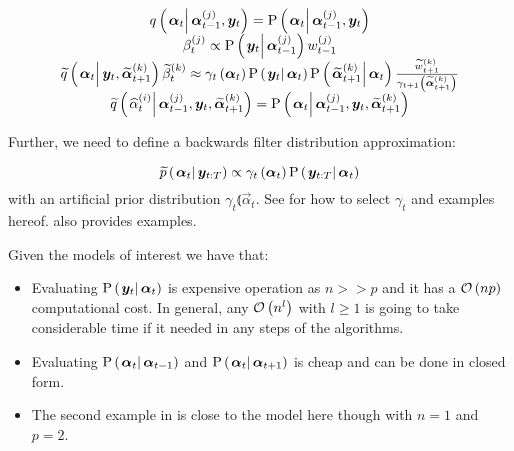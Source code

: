 \begin{equation}\begin{matrix}
	\IDC{\vec{\alpha}_t}{\partic{\vec{\alpha}}{t-1}{j}, \vec{y}_t} = \propC{\vec{\alpha}_t}{\partic{\vec{\alpha}}{t-1}{j}, \vec{y}_t} \\
	\partic{\beta}{t}{j} \propto \propC{\vec{y}_t}{\partic{\vec{\alpha}}{t-1}{j}}\partic{w}{t-1}{j} \\
%
	\IDAproxC{\vec{\alpha}_t}{\vec{y}_t, \particB{\vec{\alpha}}{t + 1}{k}}\particB{\beta}{t}{k} \approx %
		\gamma_t\Lparen{\vec{\alpha}_t}
		\propC{\vec{y}_t}{\vec{\alpha}_t}
		\propC{\particB{\vec{\alpha}}{t + 1}{k}}{\vec{\alpha}_t}
		\frac{\particB{w}{t + 1}{k}}{\gamma_{t + 1}\Lparen{\particB{\vec{\alpha}}{t + 1}{k}}} \\
%
	\IDAproxC{\particS{\alpha}{t}{i}}{\partic{\vec{\alpha}}{t-1}{j},\vec{y}_t, \particB{\vec{\alpha}}{t+1}{k}} = 
		\propC{\vec{\alpha}_t}{\partic{\vec{\alpha}}{t-1}{j},\vec{y}_t, \particB{\vec{\alpha}}{t+1}{k}}
\end{matrix}\end{equation}

Further, we need to define a backwards filter distribution approximation:

\begin{equation}
	\propAproxC{\vec{\alpha}_t}{\vec{y}_{t:T}} \propto \gamma_t \Lparen{\vec{\alpha}_t}\propC{\vec{y}_{t:T}}{\vec{\alpha}_t}
\end{equation}%
%
with an artificial prior distribution $\gamma_t \Lparen{\vec{\alpha}_t}$. See \cite{briers10} for how to select $\gamma_t$ and examples hereof. \cite{fearnhead10} also provides examples. 

Given the models of interest we have that:

\begin{itemize}
	\item Evaluating $\propC{\vec{y}_t}{\vec{\alpha}_t}$ is expensive operation as $n >> p$ and it has a $\mathcal{O}\left( np\right)$ computational cost. In general, any $\mathcal{O}\left( n^l\right)$ with $l \geq 1$ is going to take considerable time if it needed in any steps of the algorithms. 
	\item Evaluating $\propC{\vec{\alpha}_t}{\vec{\alpha}_{t -1}}$ and $\propC{\vec{\alpha}_t}{\vec{\alpha}_{t + 1}}$ is cheap and can be done in closed form.
	\item The second example in \cite{fearnhead10} is close to the model here though with $n = 1$ and $p = 2$. 
\end{itemize}

